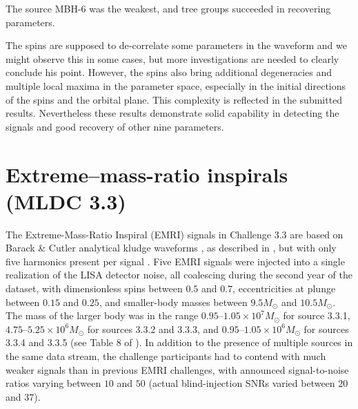 \documentclass{iopart}
\begin{document}
The source MBH-6 was the weakest, and tree groups succeeded in recovering parameters. 

The spins are supposed to de-correlate some parameters in the waveform \cite{SpinBBHLangHugues} and we 
might observe this in some cases, but more investigations are needed to clearly conclude his point.
However, the spins also bring additional degeneracies and multiple local maxima in the parameter space, especially in the initial directions of the spins and the orbital plane. This complexity is reflected in the submitted results.
Nevertheless these results demonstrate solid capability in detecting the signals and good recovery of other 
nine parameters. 

\section{Extreme--mass-ratio inspirals (MLDC 3.3)}

The Extreme-Mass-Ratio Inspiral (EMRI) signals in Challenge 3.3 are based on Barack \& Cutler analytical kludge waveforms \cite{barackcutler}, as described in \cite{mldcgwdaw2}, but with only five harmonics present per signal \cite{MLDC3}.  Five EMRI signals were injected into a single realization of the LISA detector noise, all coalescing during the second year of the dataset, with dimensionless spins between $0.5$ and $0.7$, eccentricities at plunge between $0.15$ and $0.25$, and smaller-body masses between $9.5 M_\odot$ and $10.5 M_\odot$.  The mass of the larger body was in the range $0.95$--$1.05\times10^7 M_\odot$ for source 3.3.1,  $4.75$--$5.25 \times10^6 M_\odot$ for sources 3.3.2 and 3.3.3, and $0.95$--$1.05\times10^6 M_\odot$ for sources 3.3.4 and 3.3.5 (see Table 8 of \cite{MLDC3}).  In addition to the presence of multiple sources in the same data stream, the challenge participants had to contend with much weaker signals than in previous EMRI challenges, with announced signal-to-noise ratios varying between $10$ and $50$ (actual blind-injection SNRs varied between $20$ and $37$).
\end{document}
